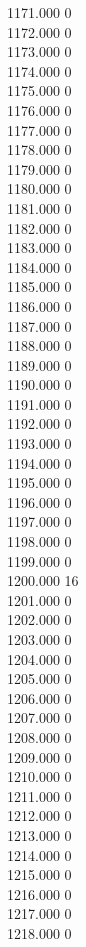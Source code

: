 { 1171.000	0 \\
 1172.000	0 \\
 1173.000	0 \\
 1174.000	0 \\
 1175.000	0 \\
 1176.000	0 \\
 1177.000	0 \\
 1178.000	0 \\
 1179.000	0 \\
 1180.000	0 \\
 1181.000	0 \\
 1182.000	0 \\
 1183.000	0 \\
 1184.000	0 \\
 1185.000	0 \\
 1186.000	0 \\
 1187.000	0 \\
 1188.000	0 \\
 1189.000	0 \\
 1190.000	0 \\
 1191.000	0 \\
 1192.000	0 \\
 1193.000	0 \\
 1194.000	0 \\
 1195.000	0 \\
 1196.000	0 \\
 1197.000	0 \\
 1198.000	0 \\
 1199.000	0 \\
 1200.000	16 \\
 1201.000	0 \\
 1202.000	0 \\
 1203.000	0 \\
 1204.000	0 \\
 1205.000	0 \\
 1206.000	0 \\
 1207.000	0 \\
 1208.000	0 \\
 1209.000	0 \\
 1210.000	0 \\
 1211.000	0 \\
 1212.000	0 \\
 1213.000	0 \\
 1214.000	0 \\
 1215.000	0 \\
 1216.000	0 \\
 1217.000	0 \\
 1218.000	0 \\
}
